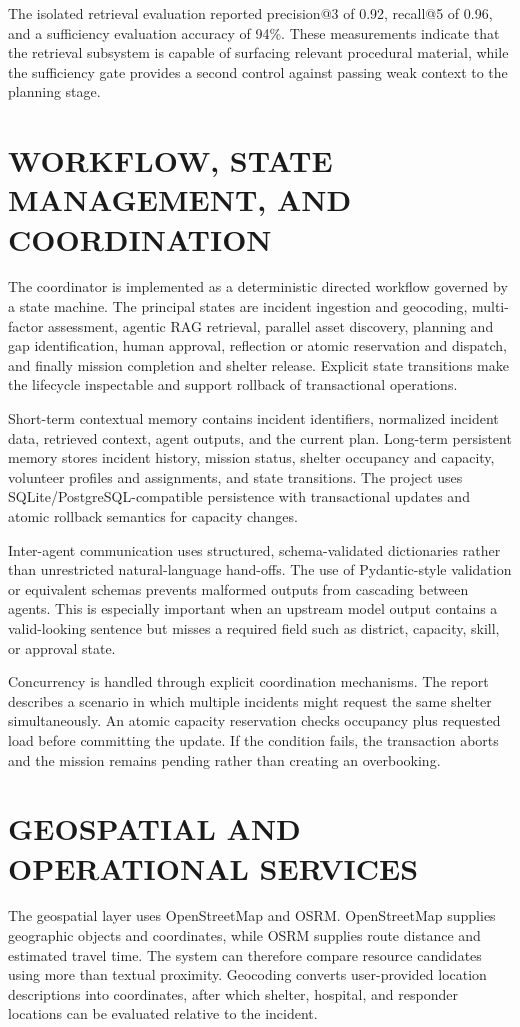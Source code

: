 \documentclass[conference]{IEEEtran}
\begin{document}
The isolated retrieval evaluation reported precision@3 of 0.92, recall@5 of 0.96, and a sufficiency evaluation accuracy of 94\%. These measurements indicate that the retrieval subsystem is capable of surfacing relevant procedural material, while the sufficiency gate provides a second control against passing weak context to the planning stage.

\section{WORKFLOW, STATE MANAGEMENT, AND COORDINATION}
The coordinator is implemented as a deterministic directed workflow governed by a state machine. The principal states are incident ingestion and geocoding, multi-factor assessment, agentic RAG retrieval, parallel asset discovery, planning and gap identification, human approval, reflection or atomic reservation and dispatch, and finally mission completion and shelter release. Explicit state transitions make the lifecycle inspectable and support rollback of transactional operations.

Short-term contextual memory contains incident identifiers, normalized incident data, retrieved context, agent outputs, and the current plan. Long-term persistent memory stores incident history, mission status, shelter occupancy and capacity, volunteer profiles and assignments, and state transitions. The project uses SQLite/PostgreSQL-compatible persistence with transactional updates and atomic rollback semantics for capacity changes.

Inter-agent communication uses structured, schema-validated dictionaries rather than unrestricted natural-language hand-offs. The use of Pydantic-style validation or equivalent schemas prevents malformed outputs from cascading between agents. This is especially important when an upstream model output contains a valid-looking sentence but misses a required field such as district, capacity, skill, or approval state.

Concurrency is handled through explicit coordination mechanisms. The report describes a scenario in which multiple incidents might request the same shelter simultaneously. An atomic capacity reservation checks occupancy plus requested load before committing the update. If the condition fails, the transaction aborts and the mission remains pending rather than creating an overbooking.

\section{GEOSPATIAL AND OPERATIONAL SERVICES}
The geospatial layer uses OpenStreetMap and OSRM. OpenStreetMap supplies geographic objects and coordinates, while OSRM supplies route distance and estimated travel time. The system can therefore compare resource candidates using more than textual proximity. Geocoding converts user-provided location descriptions into coordinates, after which shelter, hospital, and responder locations can be evaluated relative to the incident.
\end{document}
